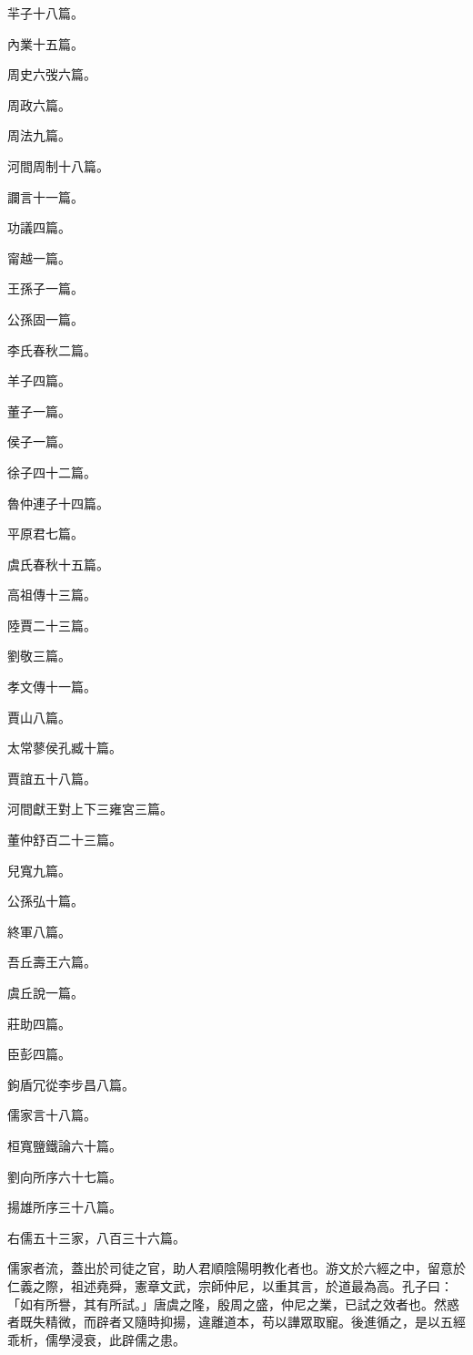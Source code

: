 \begin{pinyinscope}
羋子十八篇。

內業十五篇。

周史六弢六篇。

周政六篇。

周法九篇。

河間周制十八篇。

讕言十一篇。

功議四篇。

甯越一篇。

王孫子一篇。

公孫固一篇。

李氏春秋二篇。

羊子四篇。

董子一篇。

侯子一篇。

徐子四十二篇。

魯仲連子十四篇。

平原君七篇。

虞氏春秋十五篇。

高祖傳十三篇。

陸賈二十三篇。

劉敬三篇。

孝文傳十一篇。

賈山八篇。

太常蓼侯孔臧十篇。

賈誼五十八篇。

河間獻王對上下三雍宮三篇。

董仲舒百二十三篇。

兒寬九篇。

公孫弘十篇。

終軍八篇。

吾丘壽王六篇。

虞丘說一篇。

莊助四篇。

臣彭四篇。

鉤盾冗從李步昌八篇。

儒家言十八篇。

桓寬鹽鐵論六十篇。

劉向所序六十七篇。

揚雄所序三十八篇。

右儒五十三家，八百三十六篇。

儒家者流，蓋出於司徒之官，助人君順陰陽明教化者也。游文於六經之中，留意於仁義之際，祖述堯舜，憲章文武，宗師仲尼，以重其言，於道最為高。孔子曰：「如有所譽，其有所試。」唐虞之隆，殷周之盛，仲尼之業，已試之效者也。然惑者既失精微，而辟者又隨時抑揚，違離道本，苟以譁眾取寵。後進循之，是以五經乖析，儒學浸衰，此辟儒之患。


\end{pinyinscope}
